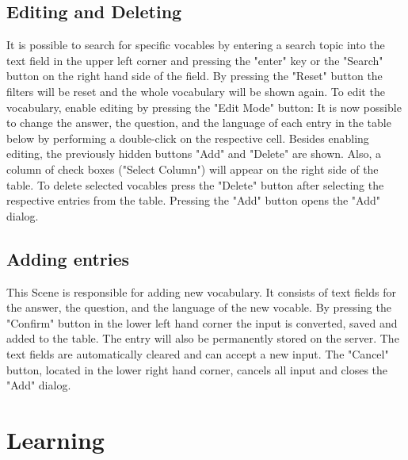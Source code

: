         \subsection{Editing and Deleting}
        It is possible to search for specific vocables by entering a search topic into the text field in the upper left corner and pressing the "enter" key or the "Search" button on the right hand side of the field. By pressing the "Reset" button the filters will be reset and the whole vocabulary will be shown again.
        To edit the vocabulary, enable editing by pressing the "Edit Mode" button:
        It is now possible to change the answer, the question, and the language of each entry in the table below by performing a double-click on the respective cell. Besides enabling editing, the previously hidden buttons "Add" and "Delete" are shown. Also, a column of check boxes  ("Select Column") will appear on the right side of the table. To delete selected vocables  press the "Delete" button after selecting the respective entries from the table.  
        Pressing the "Add" button opens the "Add" dialog.
  
        \subsection{Adding entries} 
        This Scene is responsible for adding new vocabulary. It consists of text fields for the answer, the question, and the language of the new vocable. By pressing the "Confirm" button in the lower left hand corner the input is converted, saved and added to the table. The entry will also be permanently stored on the server. The text fields are automatically cleared and can accept a new input. The "Cancel" button, located in the lower right hand corner, cancels all input and closes the "Add" dialog.
    
    \section{Learning}
        

